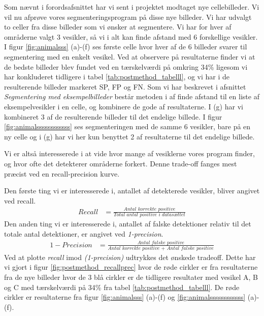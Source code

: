 Som nævnt i forordsafsnittet har vi sent i projektet modtaget nye cellebilleder. Vi vil nu afprøve vores segmenteringsprogram på disse nye billeder. Vi har udvalgt to celler fra disse billeder som vi ønsker at segmentere. Vi har for hver af områderne valgt 3 vesikler, så vi i alt kan finde afstand med 6 forskellige vesikler. I figur \ref{fig:animalsss} (a)-(f) ses første celle hvor hver af de 6 billeder svarer til segmentering med en enkelt vesikel. Ved at observere på resultaterne finder vi at de bedste billeder blev fundet ved en tærskelværdi på omkring 34\% ligesom vi har konkluderet tidligere i tabel \ref{tab:postmethod_tabelll}, og vi har i de resulterende billeder markeret SP, FP og FN. Som vi har beskrevet i afsnittet \emph{Segmentering med eksempelbilleder} består metoden i af finde afstand til en liste af eksempelvesikler i en celle, og kombinere de gode af resultaterne. I (g) har vi kombineret 3 af de resulterende billeder til det endelige billede. I figur \ref{fig:animalssssssssssss} ses segmenteringen med de samme 6 vesikler, bare på en ny celle og i (g) har vi her kun benyttet 2 af resultaterne til det endelige billede.

Vi er altså interesserede i at vide hvor mange af vesiklerne vores program finder, og hvor ofte det detekterer områderne forkert. Denne trade-off fanges mest præcist ved en recall-precision kurve.

Den første ting vi er interesserede i, antallet af detekterede vesikler, bliver angivet ved recall. 
\begin{align}
	Recall &= \frac{\textit{Antal korrekte positive}}{\textit{Total antal positive i datasættet}}
\end{align}
Den anden ting vi er interesserede i, antallet af falske detektioner relativ til det totale antal detektioner, er angivet ved \emph{1-precision}.
\begin{align}
	1-Precision &= \frac{\textit{Antal falske positive}}{\textit{Antal korrekte positive + Antal falske positive}}
\end{align}
Ved at plotte \emph{recall} imod \emph{(1-precision)} udtrykkes det ønskede tradeoff. Dette har vi gjort i figur \ref{fig:postmethod_recallprec} hvor de røde cirkler er fra resultaterne fra de nye billeder hvor de 3 blå cirkler er de tidligere resultater med vesikel A, B og C med tærskelværdi på 34\% fra tabel \ref{tab:postmethod_tabelll}. De røde cirkler er resultaterne fra figur \ref{fig:animalsss} (a)-(f) og \ref{fig:animalssssssssssss} (a)-(f).

